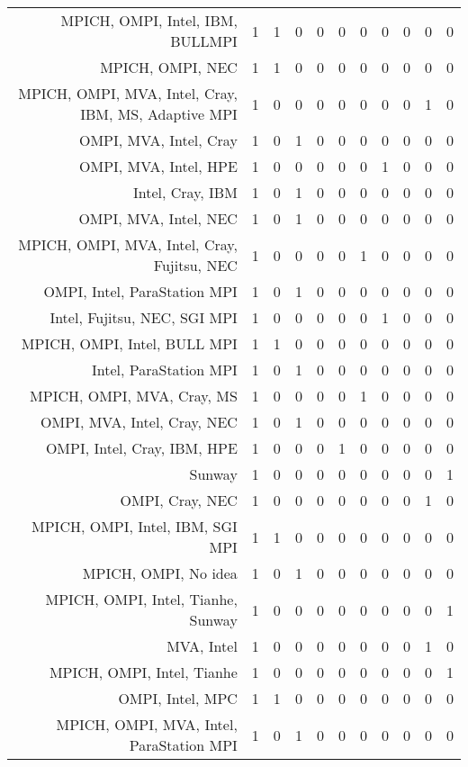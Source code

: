 {\begin{landscape}
\begin{longtable}[htb]{r|c|c|c|c|c|c|c|c|c|c}
{MPICH, OMPI, Intel, IBM, BULLMPI} & 1 & 1 & 0 & 0 & 0 & 0 & 0 & 0 & 0 & 0 \\%
{MPICH, OMPI, NEC} & 1 & 1 & 0 & 0 & 0 & 0 & 0 & 0 & 0 & 0 \\%
{MPICH, OMPI, MVA, Intel, Cray, IBM, MS, Adaptive MPI} & 1 & 0 & 0 & 0 & 0 & 0 & 0 & 0 & 1 & 0 \\%
{OMPI, MVA, Intel, Cray} & 1 & 0 & 1 & 0 & 0 & 0 & 0 & 0 & 0 & 0 \\%
{OMPI, MVA, Intel, HPE} & 1 & 0 & 0 & 0 & 0 & 0 & 1 & 0 & 0 & 0 \\%
{Intel, Cray, IBM} & 1 & 0 & 1 & 0 & 0 & 0 & 0 & 0 & 0 & 0 \\%
{OMPI, MVA, Intel, NEC} & 1 & 0 & 1 & 0 & 0 & 0 & 0 & 0 & 0 & 0 \\%
{MPICH, OMPI, MVA, Intel, Cray, Fujitsu, NEC} & 1 & 0 & 0 & 0 & 0 & 1 & 0 & 0 & 0 & 0 \\%
{OMPI, Intel, ParaStation MPI} & 1 & 0 & 1 & 0 & 0 & 0 & 0 & 0 & 0 & 0 \\%
{Intel, Fujitsu, NEC, SGI MPI} & 1 & 0 & 0 & 0 & 0 & 0 & 1 & 0 & 0 & 0 \\%
{MPICH, OMPI, Intel, BULL MPI} & 1 & 1 & 0 & 0 & 0 & 0 & 0 & 0 & 0 & 0 \\%
{Intel, ParaStation MPI} & 1 & 0 & 1 & 0 & 0 & 0 & 0 & 0 & 0 & 0 \\%
{MPICH, OMPI, MVA, Cray, MS} & 1 & 0 & 0 & 0 & 0 & 1 & 0 & 0 & 0 & 0 \\%
{OMPI, MVA, Intel, Cray, NEC} & 1 & 0 & 1 & 0 & 0 & 0 & 0 & 0 & 0 & 0 \\%
{OMPI, Intel, Cray, IBM, HPE} & 1 & 0 & 0 & 0 & 1 & 0 & 0 & 0 & 0 & 0 \\%
{Sunway} & 1 & 0 & 0 & 0 & 0 & 0 & 0 & 0 & 0 & 1 \\%
{OMPI, Cray, NEC} & 1 & 0 & 0 & 0 & 0 & 0 & 0 & 0 & 1 & 0 \\%
{MPICH, OMPI, Intel, IBM, SGI MPI} & 1 & 1 & 0 & 0 & 0 & 0 & 0 & 0 & 0 & 0 \\%
{MPICH, OMPI, No idea} & 1 & 0 & 1 & 0 & 0 & 0 & 0 & 0 & 0 & 0 \\%
{MPICH, OMPI, Intel, Tianhe, Sunway} & 1 & 0 & 0 & 0 & 0 & 0 & 0 & 0 & 0 & 1 \\%
{MVA, Intel} & 1 & 0 & 0 & 0 & 0 & 0 & 0 & 0 & 1 & 0 \\%
{MPICH, OMPI, Intel, Tianhe} & 1 & 0 & 0 & 0 & 0 & 0 & 0 & 0 & 0 & 1 \\%
{OMPI, Intel, MPC} & 1 & 1 & 0 & 0 & 0 & 0 & 0 & 0 & 0 & 0 \\%
{MPICH, OMPI, MVA, Intel, ParaStation MPI} & 1 & 0 & 1 & 0 & 0 & 0 & 0 & 0 & 0 & 0 \\%

\end{longtable}
\end{landscape}}
